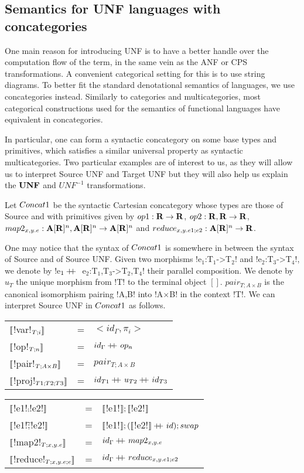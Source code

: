 \subsection{Semantics for UNF languages with concategories} %
\label{sub:Semantics for UNF using concategories}

One main reason for introducing UNF is to have a better handle over
the computation flow of the term, in the same vein as the ANF or CPS transformations.
A convenient categorical setting for this is to use string diagrams.
To better fit the standard denotational semantics of languages, 
we use concategories instead. Similarly to categories and multicategories, 
most categorical constructions used for the semantics of functional languages 
have equivalent in concategories.

In particular, one can form a syntactic concategory on some base types and primitives, 
which satisfies a similar universal property as syntactic multicategories.
Two particular examples are of interest to us, as they will allow us to interpret Source UNF and Target UNF
but they will also help us explain the $\mathbf{UNF}$ and $UNF^{-1}$ transformations.

\begin{definition}[$\ConcatS$]
Let $\ConcatS$ be the syntactic Cartesian concategory whose types are those of Source and 
with primitives given by $op1: \mathbf{R} \to \mathbf{R}$, $op2: \mathbf{R},\mathbf{R} \to \mathbf{R}$, 
$map2_{x,y.e}: \mathbf{A}[\mathbf{R}]^{n},\mathbf{A}[\mathbf{R}]^{n}\to \mathbf{A}[\mathbf{R}]^{n}$ and $reduce_{x,y.e1;e2}:\mathbf{A}[\mathbf{R}]^{n}\to \mathbf{R}$.
\end{definition}

One may notice that the syntax of $\ConcatS$ is somewhere in between the syntax of Source and of Source UNF.
Given two morphisms !e$_1$:T$_1$->T$_2$! and !e$_2$:T$_3$->T$_4$!, we denote by !e$_1 +\kern-1.3ex+\kern0.8ex$ e$_2$:T$_1$,T$_3$->T$_2$,T$_4$! 
their parallel composition.
We denote by $u_T$ the unique morphism from !T! to the terminal object $[]$.
$pair_{T;A\times B}$ is the canonical isomorphism pairing !A,B! into !A$\times$B! in the context !T!.
We can interpret Source UNF in $\ConcatS$ as follows.

\begin{tabular}{l c l}
   $\llbracket$!var!$_{T;i} \rrbracket$ &=& $<id_\Gamma,\pi_i>$ \\
   $\llbracket$!op!$_{T;n} \rrbracket$ &=& $id_\Gamma+\kern-1.3ex+\kern0.8ex op_n$\\
   $\llbracket$!pair!$_{T;A\times B} \rrbracket$ &=& $pair_{T;A\times B}$ \\
   $\llbracket$!proj!$_{T1;T2;T3} \rrbracket$ &=& $id_{T1}+\kern-1.3ex+\kern0.8ex u_{T2}+\kern-1.3ex+\kern0.8ex id_{T3}$
    \end{tabular}
   \begin{tabular}{l c l}
   $\llbracket$!e1!$\comp$!e2!$\rrbracket$  &=& $\llbracket$!e1!$\rrbracket ; \llbracket$!e2!$\rrbracket$ \\
   $\llbracket$!e1!$\widetilde{;}$!e2!$\rrbracket$ &=& $\llbracket$!e1!$\rrbracket ; (\llbracket$!e2!$\rrbracket+\kern-1.3ex+\kern0.8ex id ); swap$ \\
   $\llbracket$!map2!$_{T;x,y.e}\rrbracket$  &=& $id_\Gamma+\kern-1.3ex+\kern0.8ex map2_{x,y.e}$ \\
   $\llbracket$!reduce!$_{T;x,y.e;e}\rrbracket$ &=& $id_\Gamma+\kern-1.3ex+\kern0.8ex reduce_{x,y.e1;e2}$
\end{tabular}

